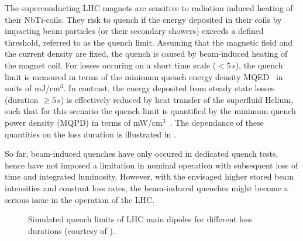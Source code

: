 The superconducting LHC magnets are sensitive to radiation induced heating of their NbTi-coils. They risk to quench if the energy deposited in their coils by impacting beam particles (or their secondary showers) exceeds a defined threshold, referred to as the quench limit. Assuming that the magnetic field and the current density are fixed, the quench is caused by beam-induced heating of the magnet coil. For losses occuring on a short time scale ($<$5\,s), the quench limit is measured in terms of the minimum quench energy density MQED~\cite{PhysRevSTAB.18.061002} in units of mJ/cm$^3$. In contrast, the energy deposited from steady state losses (duration $\geq 5\,$s) is effectively reduced by heat transfer of the superfluid Helium, such that for this scenario the quench limit is quantified by the minimum quench power density (MQPD) in terms of mW/cm$^3$~\cite{lhcprojreport44,PhysRevSTAB.18.061002}. The dependance of these quantities on the loss duration is illustrated in .


So far, beam-induced quenches have only occured in dedicated quench tests, hence have not imposed a limitation in nominal operation with subsequent loss of time and integrated luminosity. However, with the envisaged higher stored beam intensities and constant loss rates, the beam-induced quenches might become a serious issue in the operation of the LHC. 

\begin{figure}[t]
  \centering
  \caption{Simulated quench limits of LHC main dipoles for different loss durations (courtesy of \cite{PhysRevSTAB.18.061002}).}  
  \label{pic:16070403}
  \end{figure}


